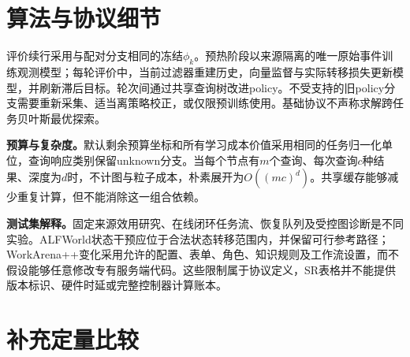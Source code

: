 \documentclass[sigconf,anonymous,review]{acmart}
\theoremstyle{zhplain}
\begin{document}

\appendix
\section{算法与协议细节}
\label{app:details}



评价续行采用与配对分支相同的冻结\(\phi_k\)。预热阶段以来源隔离的唯一原始事件训练观测模型；每轮评价中，当前过滤器重建历史，向量监督与实际转移损失更新模型，并刷新滞后目标。轮次间通过共享查询树改进policy。不受支持的旧policy分支需要重新采集、适当离策略校正，或仅限预训练使用。基础协议不声称求解跨任务贝叶斯最优探索。

\textbf{预算与复杂度。}默认剩余预算坐标和所有学习成本价值采用相同的任务归一化单位，查询响应类别保留unknown分支。当每个节点有\(m\)个查询、每次查询\(c\)种结果、深度为\(d\)时，不计图与粒子成本，朴素展开为\(O((mc)^d)\)。共享缓存能够减少重复计算，但不能消除这一组合依赖。

\textbf{测试集解释。}固定来源效用研究、在线闭环任务流、恢复队列及受控图诊断是不同实验。ALFWorld状态干预应位于合法状态转移范围内，并保留可行参考路径；WorkArena++变化采用允许的配置、表单、角色、知识规则及工作流设置，而不假设能够任意修改专有服务端代码。这些限制属于协议定义，SR表格并不能提供版本标识、硬件时延或完整控制器计算账本。

\section{补充定量比较}
\label{app:results}
\end{document}

